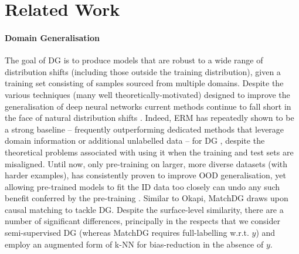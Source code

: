 \section{Related Work}\label{sec:related_work}
\paragraph{Domain Generalisation} 
%
The goal of \acf{DG} is to produce models that are robust to a wide range of distribution shifts
(including those outside the training distribution), given a training set consisting of samples
sourced from multiple domains.
%
Despite the various techniques (many well theoretically-motivated) designed to improve the
generalisation of deep neural networks current methods continue to fall short in the face of
natural distribution shifts \citep{gulrajani2020search, koh2021wilds}.
%
Indeed, ERM has repeatedly shown to be a strong baseline -- frequently outperforming dedicated
methods that leverage domain information or additional unlabelled data -- for \ac{DG}
\citep{gulrajani2020search, SagWeiLeeGaoetal22}, despite the theoretical problems associated with
using it when the training and test sets are misaligned.
%
Until now, only pre-training on larger, more diverse datasets (with harder examples), has
consistently proven to improve OOD generalisation, yet allowing pre-trained models to fit the ID
data too closely can undo any such benefit conferred by the pre-training
\citep{andreassen2021evolution, kim2022broad, taori2020measuring, wiles2022a}.
%
%
Similar to Okapi, MatchDG \citep{mahajan2021domain} draws upon causal matching to tackle \ac{DG}.
Despite the surface-level similarity, there are a number of significant differences, principally in
the respects that we consider semi-supervised \ac{DG} (whereas MatchDG requires full-labelling
w.r.t. $y$) and employ an augmented form of k-NN for bias-reduction in the absence of $y$.

